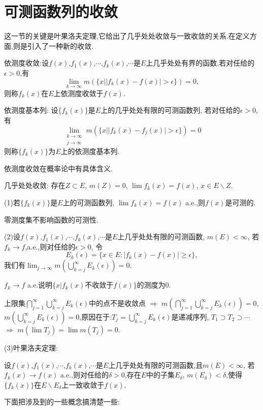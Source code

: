 \documentclass[12pt,a4paper,openany]{book}
\begin{document}
\section{可测函数列的收敛}
这一节的关键是叶果洛夫定理,它给出了几乎处处收敛与一致收敛的关系.在定义方面,则是引入了一种新的收敛.

依测度收敛:设$f(x)$,$f_1(x)$,$\cdots$,$f_k(x)$,$\cdots$是$E$上几乎处处有界的函数,若对任给的$\epsilon>0$,有
\[
\lim_{k \rightarrow \infty}{m(\{x | |f_k(x) - f(x)| > \epsilon\})} = 0,
\]
则称$f_k(x)$在$E$上依测度收敛于$f(x)$.

依测度基本列: 设$\{f_k(x)\}$是$E$上的几乎处处有限的可测函数列, 若对任给的$\epsilon > 0$, 有
\[
\lim_{\substack{k \rightarrow \infty \\ j\rightarrow \infty}}{m(\{x | |f_k(x)-f_j(x)| > \epsilon\})} = 0
\]
则称$\{f_k(x)\}$为$E$上的依测度基本列.

依测度收敛在概率论中有具体含义.

几乎处处收敛: 存在$Z \subset E$, $m(Z) = 0$, $\lim{f_k(x)} = f(x)$, $x \in E \backslash Z$.

(1)若$\{f_k(x)\}$是$E$上的可测函数列, $\lim{f_k(x)} = f(x)$ a.e.,则$f(x)$是可测的.

零测度集不影响函数的可测性.

(2)设$f(x)$,$f_1(x)$,$\cdots$,$f_k(x)$,$\cdots$是$E$上几乎处处有限的可测函数, $m(E)<\infty$, 若$f_k\rightarrow f$,a.e.,则对任给的$\epsilon>0$, 令
\[
E_k(\epsilon) = \{x \in E: |f_k(x) - f(x)| \ge \epsilon \},
\]
我们有$\lim_{j \rightarrow \infty}{m(\bigcup_{k=j}^{\infty}{E_k(\epsilon)})} = 0$.

$f_k \rightarrow f$ a.e.说明$\{x | f_k(x)\text{不收敛于}f(x)\}$的测度为0.

上限集$\bigcap_{j=1}^{\infty}{\bigcup_{k=j}^{\infty}{E_k(\epsilon)}}$中的点不是收敛点 $\Rightarrow$ $m(\bigcap_{j=1}^{\infty}{\bigcup_{k=j}^{\infty}{E_k(\epsilon)}}) = 0$, $m(\bigcup_{k=j}^{\infty}{E_k(\epsilon)}) = 0$,原因在于:$T_j=\bigcup_{k=j}^{\infty}{E_k(\epsilon)}$是递减序列, $T_1 \supset T_2 \supset\cdots$ $\Rightarrow$ $m(\lim{T_j}) = \lim{m(T_j)} = 0$.


(3)叶果洛夫定理:

设$f(x)$,$f_1(x)$,$\cdots$,$f_k(x)$,$\cdots$是$E$上几乎处处有限的可测函数,且$m(E) < \infty$, 若$f_k(x) \rightarrow f(x)$ a.e.,则对任给的$\delta > 0$,存在$E$中的子集$E_{\delta}$, $m(E_{\delta})<\delta$,使得$\{f_k(x)\}$在$E\backslash E_{\delta}$上一致收敛于$f(x)$.

下面把涉及到的一些概念搞清楚一些:
\end{document}
